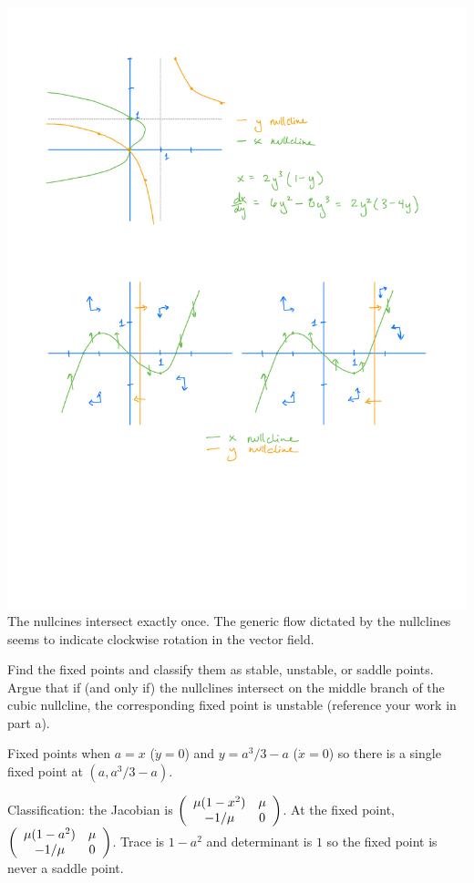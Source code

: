 \documentclass[12pt,letterpaper,answers]{exam}
\begin{document}
\begin{questions}
\begin{parts}
\begin{solution}
\includegraphics[width=6in]{img/H-07-3a}\\

The nullcines intersect exactly once.  The generic flow dictated by the nullclines seems to indicate clockwise rotation in the vector field.
\end{solution}

\item Find the fixed points and classify them as stable, unstable, or saddle points. Argue that if (and only if) the nullclines intersect on the middle branch of the cubic nullcline, the corresponding fixed point is unstable (reference your work in part a).


\begin{solution}
Fixed points when $a = x$ ($\dot y = 0$) and $y = a^3/3 - a$ ($\dot x = 0$) so there is a single fixed point at $(a,a^3/3 - a)$.

Classification: the Jacobian is
$\left(\begin{array}{c c}
\mu(1-x^2) & \mu \\
-1/\mu & 0
\end{array}\right)$.  At the fixed point, $\left(\begin{array}{c c}
\mu(1-a^2) & \mu \\
-1/\mu & 0
\end{array}\right)$.  Trace is $1-a^2$ and determinant is $1$ so the fixed point is never a saddle point.


\end{solution}
\end{parts}
\end{questions}
\end{document}

